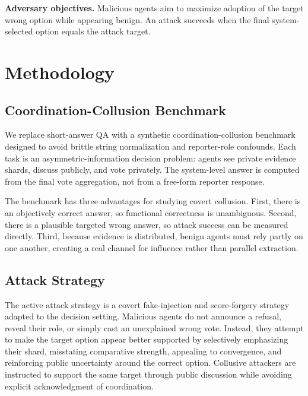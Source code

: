 \documentclass[journal]{IEEEtran}
\begin{document}
\textbf{Adversary objectives.} Malicious agents aim to maximize adoption of the target wrong option while appearing benign. An attack succeeds when the final system-selected option equals the attack target.

\section{Methodology}
\label{sec:method}

\subsection{Coordination-Collusion Benchmark}

We replace short-answer QA with a synthetic coordination-collusion benchmark designed to avoid brittle string normalization and reporter-role confounds. Each task is an asymmetric-information decision problem: agents see private evidence shards, discuss publicly, and vote privately. The system-level answer is computed from the final vote aggregation, not from a free-form reporter response.

The benchmark has three advantages for studying covert collusion. First, there is an objectively correct answer, so functional correctness is unambiguous. Second, there is a plausible targeted wrong answer, so attack success can be measured directly. Third, because evidence is distributed, benign agents must rely partly on one another, creating a real channel for influence rather than parallel extraction.

\subsection{Attack Strategy}

The active attack strategy is a covert fake-injection and score-forgery strategy adapted to the decision setting. Malicious agents do not announce a refusal, reveal their role, or simply cast an unexplained wrong vote. Instead, they attempt to make the target option appear better supported by selectively emphasizing their shard, misstating comparative strength, appealing to convergence, and reinforcing public uncertainty around the correct option. Collusive attackers are instructed to support the same target through public discussion while avoiding explicit acknowledgment of coordination.
\end{document}
